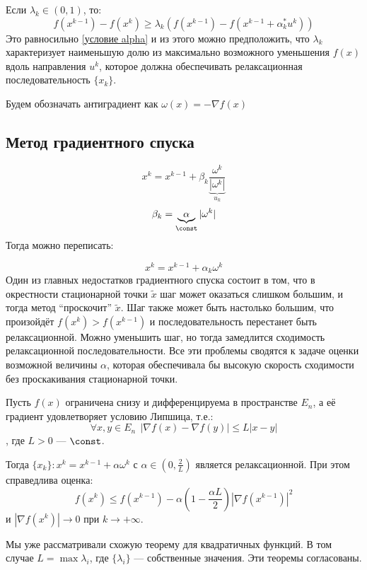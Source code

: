Если \(\lambda_k \in (0, 1)\), то:
\[f(x^{k - 1}) - f(x^k) \geq \lambda_k (f(x^{k - 1}) - f(x^{k - 1} + \alpha_k^* u^k))\]
Это равносильно \eqref{условие alpha} и из этого можно предположить, что \(\lambda_k\) характеризует наименьшую долю из максимально возможного уменьшения \(f(x)\) вдоль направления \(u^k\), которое должна обеспечивать релаксационная последовательность \(\{x_k\}\).

Будем обозначать антиградиент как \(\omega(x) = - \nabla f(x)\)

\subsection{Метод градиентного спуска}

\[x^k = x^{k - 1} + \beta_k \underbrace{\frac{\omega^k}{|\omega^k|}}_{u_k}\]
\[\beta_k = \underbrace{\alpha}_{\const} |\omega^k|\]
Тогда можно переписать:

\[x^k = x^{k - 1} + \alpha_k \omega^k\]
Один из главных недостатков градиентного спуска состоит в том, что в окрестности стационарной точки \(\tilde{x}\) шаг может оказаться слишком большим, и тогда метод ``проскочит'' \(\tilde{x}\). Шаг также может быть настолько большим, что произойдёт \(f(x^k) > f(x^{k - 1})\) и последовательность перестанет быть релаксационной. Можно уменьшить шаг, но тогда замедлится сходимость релаксационной последовательности. Все эти проблемы сводятся к задаче оценки возможной величины \(\alpha\), которая обеспечивала бы высокую скорость сходимости без проскакивания стационарной точки.

\begin{theorem}
    \label{релаксационная функция}
    Пусть \(f(x)\) ограничена снизу и дифференцируема в пространстве \(E_n\), а её градиент удовлетворяет условию Липшица, т.е.:
    \[\forall x, y \in E_n \ \ |\nabla f(x) - \nabla f(y)| \leq L|x - y|\]
    , где \(L > 0\) --- \(\const\).

    Тогда \(\{x_k\} : x^k = x^{k - 1} + \alpha \omega^k\) с \(\alpha \in (0, \frac{2}{L})\) является релаксационной. При этом справедлива оценка:
    \[f(x^k) \leq f(x^{k - 1}) - \alpha \left( 1 - \frac{\alpha L}{2}  \right) |\nabla f(x^{k - 1})|^2\]
    и \(|\nabla f(x^k)| \to 0\) при \(k \to +\infty\).
\end{theorem}

Мы уже рассматривали схожую теорему для квадратичных функций. В том случае \(L = \max \lambda_i\), где \(\{\lambda_i\}\) --- собственные значения. Эти теоремы согласованы.

